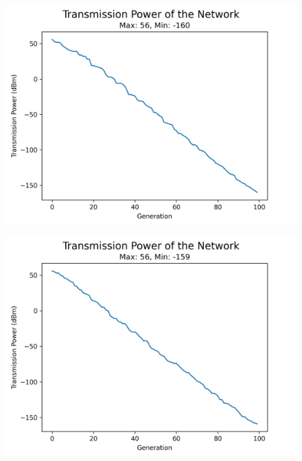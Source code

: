 \begin{figure}[H]
  \centering
  \begin{minipage}[t]{0.5\textwidth}
      \centering
      \includegraphics[width=1\linewidth]{images/research_results/genetic_algorithm_lab_power.png}
      \label{fig:ga_lab_power}
  \end{minipage}\hfill
  \begin{minipage}[t]{0.5\textwidth}
      \centering
      \includegraphics[width=1\linewidth]{images/research_results/genetic_algorithm_home_power.png}
      \label{fig:ga_home_power}
  \end{minipage}
\end{figure}


